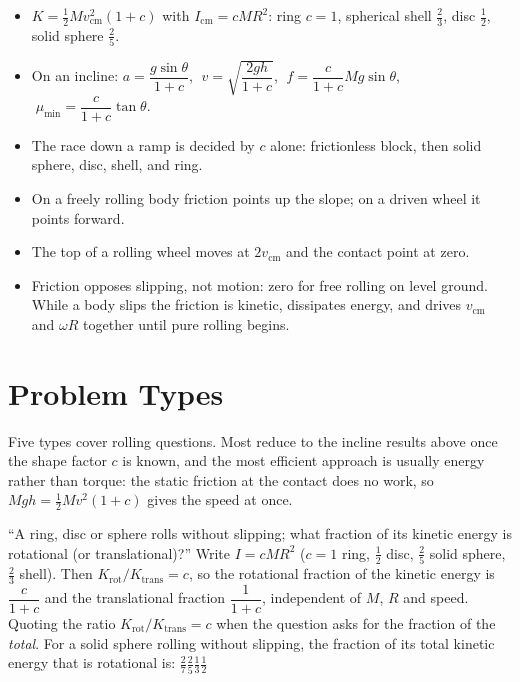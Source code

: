 \begin{itemize}
\item $K=\tfrac12Mv_{\text{cm}}^2(1+c)$ with $I_{\text{cm}}=cMR^2$: ring $c=1$, spherical shell $\tfrac23$, disc $\tfrac12$, solid sphere
      $\tfrac25$.
\item On an incline: $a=\dfrac{g\sin\theta}{1+c}$, $\;v=\sqrt{\dfrac{2gh}{1+c}}$, $\;f=\dfrac{c}{1+c}Mg\sin\theta$,
      $\;\mu_{\min}=\dfrac{c}{1+c}\tan\theta$.
\item The race down a ramp is decided by $c$ alone: frictionless block, then solid sphere, disc, shell, and ring.
\item On a freely rolling body friction points up the slope; on a driven wheel it points forward.
\item The top of a rolling wheel moves at $2v_{\text{cm}}$ and the contact point at zero.
\item Friction opposes slipping, not motion: zero for free rolling on level ground. While a body slips the
      friction is kinetic, dissipates energy, and drives $v_{\text{cm}}$ and $\omega R$ together until pure
      rolling begins.
\end{itemize}

\section{Problem Types}\label{sec:types15}
Five types cover rolling questions. Most reduce to the incline results above once the shape factor $c$ is
known, and the most efficient approach is usually energy rather than torque: the static friction at the contact does no work, so
$Mgh=\tfrac12Mv^2(1+c)$ gives the speed at once.

{``A ring, disc or sphere rolls without slipping; what fraction of its kinetic energy is rotational
(or translational)?''}
{Write $I=c MR^2$ ($c=1$ ring, $\tfrac12$ disc, $\tfrac25$ solid sphere, $\tfrac23$ shell).
Then $K_{\text{rot}}/K_{\text{trans}}=c$, so the rotational fraction of the kinetic energy is $\dfrac{c}{1+c}$ and the translational fraction $\dfrac{1}{1+c}$, independent of $M$, $R$ and speed.}
{Quoting the ratio $K_{\text{rot}}/K_{\text{trans}}=c$ when the question asks for the fraction of the \emph{total}.}
{For a solid sphere rolling without slipping, the fraction of its total kinetic energy that is
rotational is:}
{$\tfrac27$}{$\tfrac25$}{$\tfrac13$}{$\tfrac12$}

